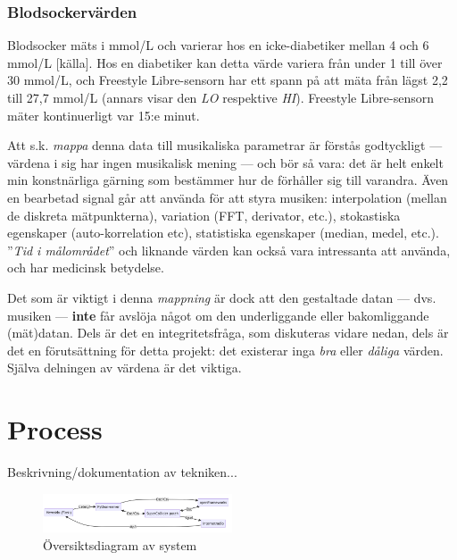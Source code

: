 \documentclass[11pt, twoside, a4paper]{article}
\begin{document}
\begin{multicols}{2}

\subsubsection*{Blodsockervärden}
Blodsocker mäts i mmol/L och varierar hos en icke-diabetiker mellan 4 och 6 mmol/L [källa]. Hos en diabetiker kan detta värde variera från under 1 till över 30 mmol/L, och Freestyle Libre-sensorn har ett spann på att mäta från lägst 2,2 till 27,7 mmol/L (annars visar den \emph{LO} respektive \emph{HI}). Freestyle Libre-sensorn mäter kontinuerligt var 15:e minut.

Att s.k. \emph{mappa} denna data till musikaliska parametrar är förstås godtyckligt --- värdena i sig har ingen musikalisk mening --- och bör så vara: det är helt enkelt min konstnärliga gärning som bestämmer hur de förhåller sig till varandra. Även en bearbetad signal går att använda för att styra musiken: interpolation (mellan de diskreta mätpunkterna), variation (FFT, derivator, etc.), stokastiska egenskaper (auto-korrelation etc), statistiska egenskaper (median, medel, etc.). ''\emph{Tid i målområdet}'' och liknande värden kan också vara intressanta att använda, och har medicinsk betydelse.

Det som är viktigt i denna \emph{mappning} är dock att den gestaltade datan --- dvs. musiken --- \textbf{inte} får avslöja något om den underliggande eller bakomliggande (mät)datan. Dels är det en integritetsfråga, som diskuteras vidare nedan, dels är det en förutsättning för detta projekt: det existerar inga \emph{bra} eller \emph{dåliga} värden. Själva delningen av värdena är det viktiga.


\section*{Process}
Beskrivning/dokumentation av tekniken...

\begin{figure}[H]
\centering
\includegraphics[width=0.5\textwidth]{../media/flowchart.png}
\caption{Översiktsdiagram av system}
\end{figure}


\end{multicols}
\end{document}

